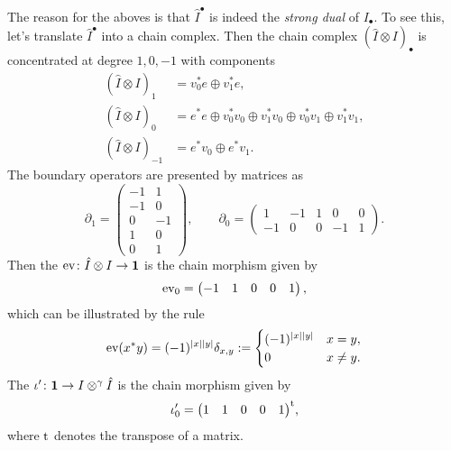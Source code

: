{The reason for the aboves is that $\hat{I}^{\bullet}$ is indeed 
the \emph{strong dual} of $I_{\bullet}$. 
To see this, let's translate $\hat{I}^{\bullet}$ into a chain complex. 
Then the chain complex $(\hat{I}\otimes I)_{\bullet}$ is 
concentrated at degree $1,0,-1$ with components
\begin{align*}
(\hat{I}\otimes I)_{1} &= 
\unit{v_0^{\ast} e}\oplus\unit{v_1^{\ast} e}, \\
(\hat{I}\otimes I)_{0} &= 
\unit{e^{\ast} e}\oplus
\unit{v_0^{\ast} v_0}\oplus\unit{v_1^{\ast} v_0}\oplus
\unit{v_0^{\ast} v_1}\oplus\unit{v_1^{\ast} v_1}, \\
(\hat{I}\otimes I)_{-1} &= 
\unit{e^{\ast} v_0}\oplus\unit{e^{\ast} v_1}.
\end{align*}
The boundary operators are presented by matrices as
\[
\partial_1=
\begin{pmatrix}
-1 & 1  \\
-1 & 0  \\
0 & -1  \\
1 & 0  \\
0 & 1 
\end{pmatrix},\qquad
\partial_0=
\begin{pmatrix}
1 & -1 & 1 & 0 & 0 \\
-1 & 0 & 0 & -1 & 1
\end{pmatrix}.
\]
Then the  
$\operatorname{ev}\colon \hat{I}\otimes I\to\mathbf{1}$ 
is the chain morphism given by 
\[
\operatorname{ev}_0=
\begin{pmatrix}
-1 & 1 & 0 & 0 & 1
\end{pmatrix},
\]
which can be illustrated by the rule
\[
\operatorname{ev}(x^{\ast}y)=(-1)^{|x||y|}\delta_{x,y}:=
\begin{cases}
(-1)^{|x||y|} & x=y,\\
0 & x\neq y.
\end{cases}
\]
The  
$\iota'\colon \mathbf{1}\to I\otimes^{\gamma}\hat{I}$ 
is the chain morphism given by 
\[
\iota'_0=
{\begin{pmatrix}
1 & 1 & 0 & 0 & 1
\end{pmatrix}}^{\rm t},
\]
where ${\rm t}$ denotes the transpose of a matrix. 

}
